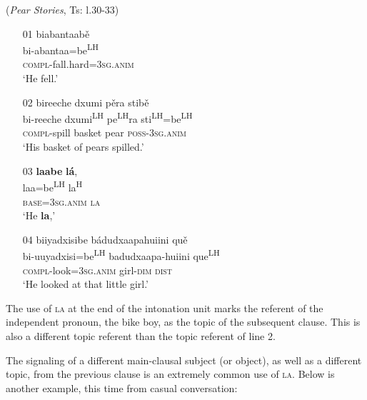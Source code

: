 \ea\label{markedIPR2}  (\textit{Pear Stories}, Ts: l.30-33)
\begin{itemize}
\item[01]
\glll biabantaab\v{e}  \\
bi-abantaa=be\textsuperscript{LH}  \\
\textsc{compl}-fall.hard=3\textsc{sg.anim}  \\
\glt `He fell.'


\item[02]
\glll bireeche dxumi p\v{e}ra stib\v{e}  \\
bi-reeche dxumi\textsuperscript{LH} pe\textsuperscript{LH}ra sti\textsuperscript{LH}=be\textsuperscript{LH}  \\
\textsc{compl}-spill basket pear \textsc{poss}-3\textsc{sg.anim}  \\
\glt `His basket of pears spilled.'


\item[03]
\glll \textbf{laabe} \textbf{l\'{a}},  \\
laa=be\textsuperscript{LH} la\textsuperscript{H}  \\
\textsc{base}=3\textsc{sg.anim} \textsc{la}  \\
\glt `He \textbf{la},'


\item[04]
\glll biiyadxisibe b\'{a}dudxaapahuiini qu\v{e}  \\
bi-uuyadxisi=be\textsuperscript{LH} badudxaapa-huiini que\textsuperscript{LH}  \\
\textsc{compl}-look=3\textsc{sg.anim} girl-\textsc{dim} \textsc{dist}  \\
\glt `He looked at that little girl.' 

\end{itemize}
\z
The use of \textsc{la} at the end of the intonation unit marks the referent of the independent pronoun, the bike boy, as the topic of the subsequent clause. This is also a different topic referent than the topic referent of line 2.

The signaling of a different main-clausal subject (or object), as well as a different topic, from the previous clause is an extremely common use of \textsc{la}.  Below is another example, this time from casual conversation:


